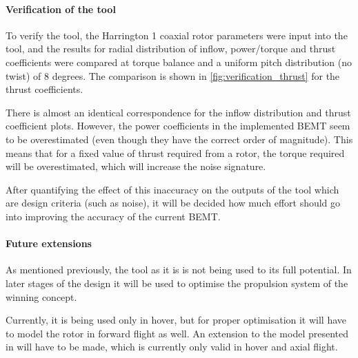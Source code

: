 \paragraph{Verification of the tool}


To verify the tool, the Harrington 1 coaxial rotor parameters were input into the tool, and the results for radial distribution of inflow, power/torque and thrust coefficients were compared at torque balance and a uniform pitch distribution (no twist) of 8 degrees. The comparison is shown in  \autoref{fig:verification_thrust} for the thrust coefficients. 

There is almost an identical correspondence for the inflow distribution and thrust coefficient plots. However, the power coefficients in the implemented BEMT seem to be overestimated (even though they have the correct order of magnitude). This means that for a fixed value of thrust required from a rotor, the torque required will be overestimated, which will increase the noise signature.

After quantifying the effect of this inaccuracy on the outputs of the tool which are design criteria (such as noise), it will be decided how much effort should go into improving the accuracy of the current BEMT.






\paragraph{Future extensions}

As mentioned previously, the tool as it is is not being used to its full potential. In later stages of the design it will be used to optimise the propulsion system of the winning concept.

Currently, it is being used only in hover, but for proper optimisation it will have to model the rotor in forward flight as well. An extension to the model presented in \cite{BEMT} will have to be made, which is currently only valid in hover and axial flight.

 

